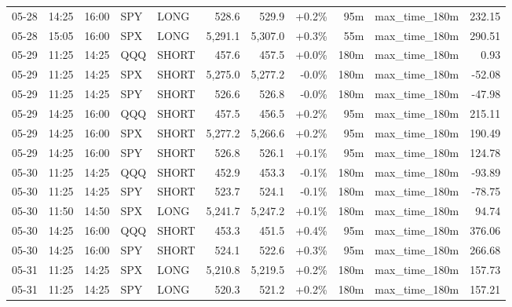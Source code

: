 \documentclass[11pt,a4paper,twoside]{article}
\begin{document}
\begin{center}
\begin{longtable}{>{\color{txtmain}}l l l l l r r r r >{\color{txtmain}}l r}
05-28 & 14:25 & 16:00 & SPY & LONG & 528.6 & 529.9 & \textcolor{wingreen}{+0.2\%} & 95m & max\_time\_180m & \textcolor{wingreen}{232.15} \\
05-28 & 15:05 & 16:00 & SPX & LONG & 5,291.1 & 5,307.0 & \textcolor{wingreen}{+0.3\%} & 55m & max\_time\_180m & \textcolor{wingreen}{290.51} \\
05-29 & 11:25 & 14:25 & QQQ & SHORT & 457.6 & 457.5 & \textcolor{wingreen}{+0.0\%} & 180m & max\_time\_180m & \textcolor{wingreen}{0.93} \\
05-29 & 11:25 & 14:25 & SPX & SHORT & 5,275.0 & 5,277.2 & \textcolor{lossred}{-0.0\%} & 180m & max\_time\_180m & \textcolor{lossred}{-52.08} \\
05-29 & 11:25 & 14:25 & SPY & SHORT & 526.6 & 526.8 & \textcolor{lossred}{-0.0\%} & 180m & max\_time\_180m & \textcolor{lossred}{-47.98} \\
05-29 & 14:25 & 16:00 & QQQ & SHORT & 457.5 & 456.5 & \textcolor{wingreen}{+0.2\%} & 95m & max\_time\_180m & \textcolor{wingreen}{215.11} \\
05-29 & 14:25 & 16:00 & SPX & SHORT & 5,277.2 & 5,266.6 & \textcolor{wingreen}{+0.2\%} & 95m & max\_time\_180m & \textcolor{wingreen}{190.49} \\
05-29 & 14:25 & 16:00 & SPY & SHORT & 526.8 & 526.1 & \textcolor{wingreen}{+0.1\%} & 95m & max\_time\_180m & \textcolor{wingreen}{124.78} \\
05-30 & 11:25 & 14:25 & QQQ & SHORT & 452.9 & 453.3 & \textcolor{lossred}{-0.1\%} & 180m & max\_time\_180m & \textcolor{lossred}{-93.89} \\
05-30 & 11:25 & 14:25 & SPY & SHORT & 523.7 & 524.1 & \textcolor{lossred}{-0.1\%} & 180m & max\_time\_180m & \textcolor{lossred}{-78.75} \\
05-30 & 11:50 & 14:50 & SPX & LONG & 5,241.7 & 5,247.2 & \textcolor{wingreen}{+0.1\%} & 180m & max\_time\_180m & \textcolor{wingreen}{94.74} \\
05-30 & 14:25 & 16:00 & QQQ & SHORT & 453.3 & 451.5 & \textcolor{wingreen}{+0.4\%} & 95m & max\_time\_180m & \textcolor{wingreen}{376.06} \\
05-30 & 14:25 & 16:00 & SPY & SHORT & 524.1 & 522.6 & \textcolor{wingreen}{+0.3\%} & 95m & max\_time\_180m & \textcolor{wingreen}{266.68} \\
05-31 & 11:25 & 14:25 & SPX & LONG & 5,210.8 & 5,219.5 & \textcolor{wingreen}{+0.2\%} & 180m & max\_time\_180m & \textcolor{wingreen}{157.73} \\
05-31 & 11:25 & 14:25 & SPY & LONG & 520.3 & 521.2 & \textcolor{wingreen}{+0.2\%} & 180m & max\_time\_180m & \textcolor{wingreen}{157.21} \\

\end{longtable}
\end{center}
\end{document}
